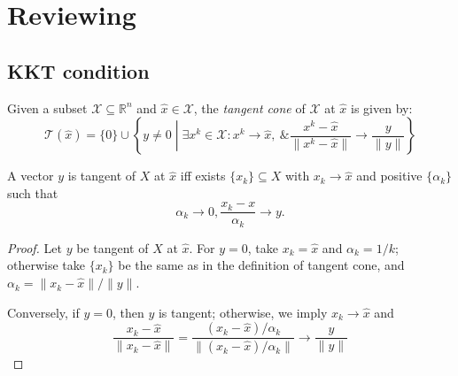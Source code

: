 \chapter{Reviewing}
\section{KKT condition}
\begin{definition}
Given a subset $\mathcal{X}\subseteq\mathbb{R}^n$ and $\hat{x}\in \mathcal{X}$, the \emph{tangent cone} of $\mathcal{X}$ at $\hat{x}$ is given by:
\[
\mathcal{T}(\hat{x})=\{0\}\cup\left\{
y\ne0
\middle|
\exists x^k\in\mathcal{X}: x^k\to\hat{x},\ \&\frac{x^k-\hat{x}}{\|x^k - \hat{x}\|}\to\frac{y}{\|y\|}
\right\}
\]
\end{definition}

\begin{proposition}
A vector $y$ is tangent of $X$ at $\hat{x}$ iff exists $\{x_k\}\subseteq X$ with $x_k\to\hat{x}$ and positive $\{\alpha_k\}$ such that 
\[
\alpha_k\to0, \frac{x_k-x}{\alpha_k}\to y.
\]
\end{proposition}
\begin{proof}
Let $y$ be tangent of $X$ at $\hat{x}$. For $y=0$, take $x_k=\hat{x}$ and $\alpha_k=1/k$; otherwise take $\{x_k\}$ be the same as in the definition of tangent cone, and $\alpha_k = \|x_k-\hat{x}\|/\|y\|$.

Conversely, if $y=0$, then $y$ is tangent; otherwise, we imply $x_k\to \hat{x}$ and
\[
\frac{x_k-\hat{x}}{\|x_k-\hat{x}\|}=\frac{(x_k-\hat{x})/\alpha_k}{\|(x_k-\hat{x})/\alpha_k\|}\to\frac{y}{\|y\|}
\]
\end{proof}

